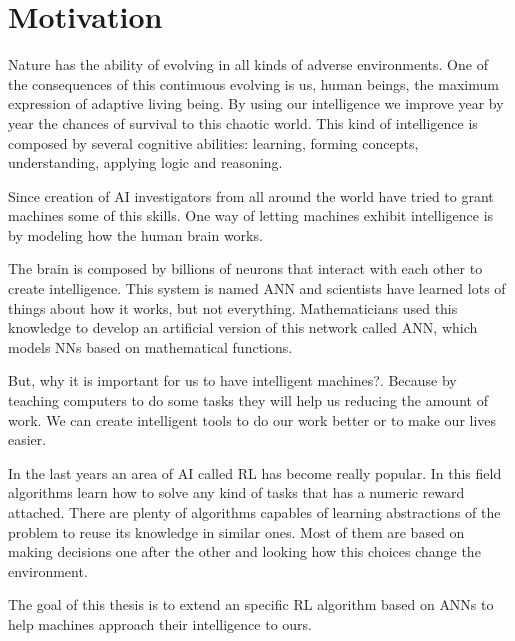 \chapter{Motivation}
Nature has the ability of evolving in all kinds of adverse environments.
One of the consequences of this continuous evolving is us, human beings,
the maximum expression of adaptive living being.
By using our intelligence we improve year by year the chances of survival
to this chaotic world.
This kind of intelligence is composed by several cognitive abilities: learning,
forming concepts, understanding, applying logic and reasoning.

Since creation of \acf{AI} investigators from all around
the world have tried to grant machines some of this skills.
One way of letting machines exhibit intelligence is by modeling how the human brain works.

The brain is composed by billions of neurons that interact with each other to create intelligence.
This system is named \acf{ANN} and scientists have learned lots of things about how it works,
but not everything.
Mathematicians used this knowledge to develop an artificial version of this network called
\acf{ANN}, which models NNs based on mathematical functions.

But, why it is important for us to have intelligent machines?.
Because by teaching computers to do some tasks they will help us reducing the amount of work.
We can create intelligent tools to do our work better or to make our lives easier.

In the last years an area of \ac{AI} called \acf{RL} has become really popular.
In this field algorithms learn how to solve any kind of tasks that has a numeric reward attached.
There are plenty of algorithms capables of learning abstractions of the problem to reuse its knowledge in similar ones.
Most of them are based on making decisions one after the other and looking how this choices change the environment.

The goal of this thesis is to extend an specific \ac{RL} algorithm based on \acp{ANN} to help machines approach their
intelligence to ours.

